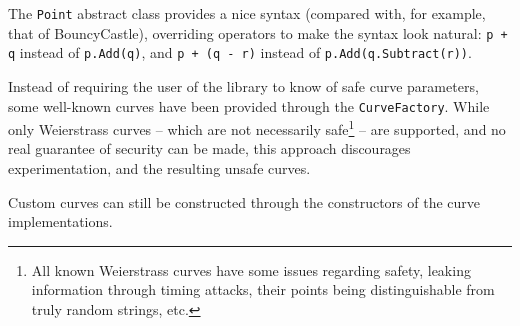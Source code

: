 The \verb+Point+ abstract class provides a nice syntax (compared with, for example, that of BouncyCastle), overriding
operators to make the syntax look natural: \verb|p + q| instead of \verb|p.Add(q)|, and \verb|p + (q - r)| instead of
\verb|p.Add(q.Subtract(r))|.

Instead of requiring the user of the library to know of safe curve parameters, some well-known curves have been
provided through the \verb|CurveFactory|. While only Weierstrass curves -- which are not necessarily
safe\footnote{All known Weierstrass curves have some issues regarding safety, leaking information through timing
attacks, their points being distinguishable from truly random strings, etc.\cite{safecurves}} -- are supported, and no real
guarantee of security can be made, this approach discourages experimentation, and the resulting unsafe curves.

Custom curves can still be constructed through the constructors of the curve implementations.

\begin{figure}
	
\end{figure}